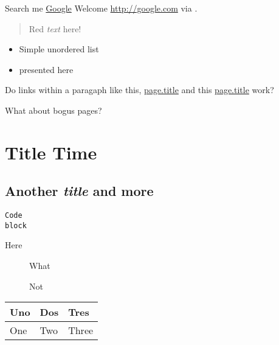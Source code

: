 Search me \href{http://google.com}{Google}
Welcome \href{http://google.com}{http://google.com} via .

\begin{quote}   %
Red \emph{text} here!
\end{quote}   %

\begin{itemize}
\item Simple unordered list
\item presented here
\end{itemize}

Do links within a paragaph like this, \href{http://localhost/pages/simple-test}{page.title} and this \href{http://localhost/pages/parent-page/child-page}{page.title} work?

What about bogus pages?

\section{Title Time}\hypertarget{title-time}{}\label{title-time}

\subsection{Another \emph{title} and more}\hypertarget{hot}{}\label{hot}

\begin{verbatim}Code
block
\end{verbatim}

\begin{description}
\item[Here] What



Not
\end{description}

\begin{longtable}{|l|l|l|}
\hline
Uno & Dos & Tres\\
\hline
One & Two & Three\\
\hline
\end{longtable}

